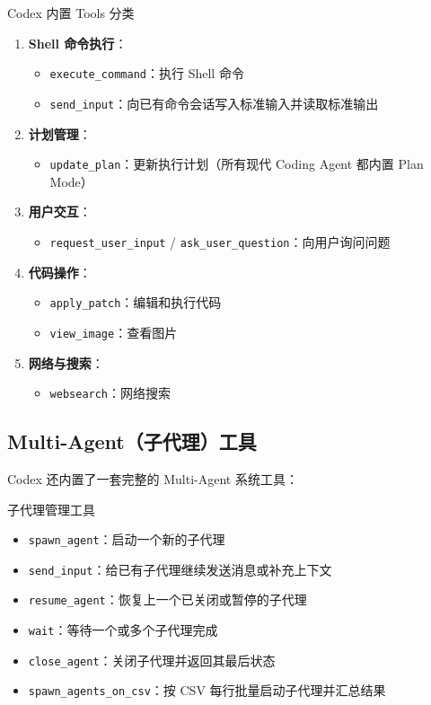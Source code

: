\documentclass[a4paper]{article}
\begin{document}
\begin{importantbox}{Codex 内置 Tools 分类}
\begin{enumerate}
    \item \textbf{Shell 命令执行}：
    \begin{itemize}
        \item \texttt{execute\_command}：执行 Shell 命令
        \item \texttt{send\_input}：向已有命令会话写入标准输入并读取标准输出
    \end{itemize}
    \item \textbf{计划管理}：
    \begin{itemize}
        \item \texttt{update\_plan}：更新执行计划（所有现代 Coding Agent 都内置 Plan Mode）
    \end{itemize}
    \item \textbf{用户交互}：
    \begin{itemize}
        \item \texttt{request\_user\_input} / \texttt{ask\_user\_question}：向用户询问问题
    \end{itemize}
    \item \textbf{代码操作}：
    \begin{itemize}
        \item \texttt{apply\_patch}：编辑和执行代码
        \item \texttt{view\_image}：查看图片
    \end{itemize}
    \item \textbf{网络与搜索}：
    \begin{itemize}
        \item \texttt{websearch}：网络搜索
    \end{itemize}
\end{enumerate}
\end{importantbox}

\subsection{Multi-Agent（子代理）工具}

Codex 还内置了一套完整的 Multi-Agent 系统工具：

\begin{importantbox}{子代理管理工具}
\begin{itemize}
    \item \texttt{spawn\_agent}：启动一个新的子代理
    \item \texttt{send\_input}：给已有子代理继续发送消息或补充上下文
    \item \texttt{resume\_agent}：恢复上一个已关闭或暂停的子代理
    \item \texttt{wait}：等待一个或多个子代理完成
    \item \texttt{close\_agent}：关闭子代理并返回其最后状态
    \item \texttt{spawn\_agents\_on\_csv}：按 CSV 每行批量启动子代理并汇总结果
\end{itemize}
\end{importantbox}
\end{document}
